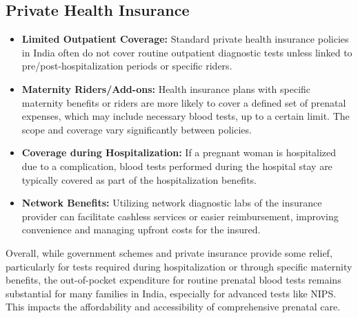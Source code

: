 \documentclass{article}
\begin{document}
\subsection{Private Health Insurance}
\begin{itemize}
    \item \textbf{Limited Outpatient Coverage:} Standard private health insurance policies in India often do not cover routine outpatient diagnostic tests unless linked to pre/post-hospitalization periods or specific riders.
    \item \textbf{Maternity Riders/Add-ons:} Health insurance plans with specific maternity benefits or riders are more likely to cover a defined set of prenatal expenses, which may include necessary blood tests, up to a certain limit. The scope and coverage vary significantly between policies.
    \item \textbf{Coverage during Hospitalization:} If a pregnant woman is hospitalized due to a complication, blood tests performed during the hospital stay are typically covered as part of the hospitalization benefits.
    \item \textbf{Network Benefits:} Utilizing network diagnostic labs of the insurance provider can facilitate cashless services or easier reimbursement, improving convenience and managing upfront costs for the insured.
\end{itemize}

Overall, while government schemes and private insurance provide some relief, particularly for tests required during hospitalization or through specific maternity benefits, the out-of-pocket expenditure for routine prenatal blood tests remains substantial for many families in India, especially for advanced tests like NIPS. This impacts the affordability and accessibility of comprehensive prenatal care.
\end{document}
